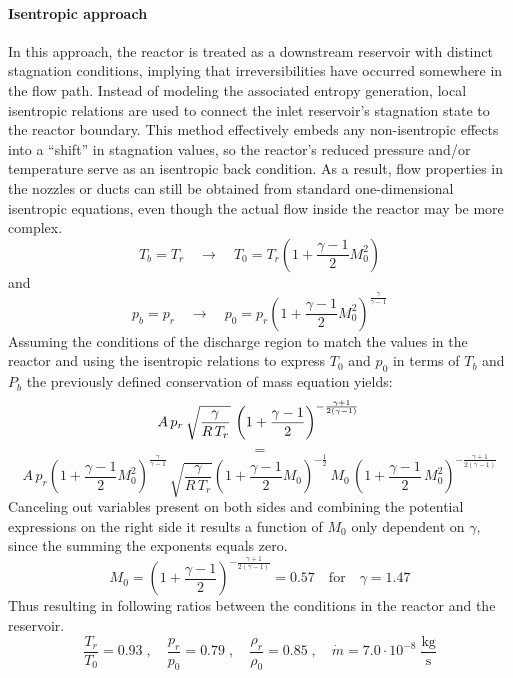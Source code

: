 \paragraph{Isentropic approach}
	In this approach, the reactor is treated as a downstream reservoir with distinct stagnation conditions, implying that irreversibilities have occurred somewhere in the flow path.
	Instead of modeling the associated entropy generation, local isentropic relations are used to connect the inlet reservoir’s stagnation state to the reactor boundary.
	This method effectively embeds any non-isentropic effects into a “shift” in stagnation values, so the reactor’s reduced pressure and/or temperature serve as an isentropic back condition.
	As a result, flow properties in the nozzles or ducts can still be obtained from standard one-dimensional isentropic equations, even though the actual flow inside the reactor may be more complex.
	$$
		T_b = T_r
		\quad \to \quad
		T_0 = T_r \left(1 + \frac{\gamma - 1}{2}M_0^2 \right)
	$$
	and
	$$
		p_b = p_r
		\quad \to \quad
		p_0 = p_r \left(1 + \frac{\gamma - 1}{2}M_0^2 \right)^{\frac{\gamma}{\gamma - 1}}
	$$
	Assuming the conditions of the discharge region to match the values in the reactor and using the isentropic relations to express $T_0$ and $p_0$ in terms of $T_b$ and $P_b$ the previously defined conservation of mass equation yields:
	$$
		A\, p_r\, \sqrt{\frac{\gamma}{R\,T_r}}\,\left(1+\frac{\gamma-1}{2}\right)^{-\frac{\gamma+1}{2(\gamma-1)}}\\
	$$
	$$
		=
	$$
	$$
		A\, p_r\left(1 + \frac{\gamma - 1}{2}M_0^2\right)^{\frac{\gamma}{\gamma-1}}\, \sqrt{\frac{\gamma}{R\,T_r}}\left(1 + \frac{\gamma - 1}{2}M_0\right)^{-\frac{1}{2}}\, M_0\,\left(1+\frac{\gamma-1}{2}\,M_0^2\right)^{-\frac{\gamma+1}{2(\gamma-1)}}
	$$
	Canceling out variables present on both sides and combining the potential expressions on the right side it results a function of $M_0$ only dependent on $\gamma$, since the summing the exponents equals zero.
	$$
		M_0 = (1 + \frac{\gamma - 1}{2})^{-\frac{\gamma + 1}{2(\gamma - 1)}}= 0.57
		\quad \text{for} \quad \gamma = 1.47
	$$
	Thus resulting in following ratios between the conditions in the reactor and the reservoir.
	$$
		\frac{T_r}{T_0} = 0.93\;,
			\quad
		\frac{p_r}{p_0} = 0.79\;,
			\quad
		\frac{\rho_r}{\rho_0} = 0.85\;,
			\quad
		\dot{m} = 7.0 \cdot 10^{-8}\; \frac{\text{kg}}{\text{s}}
	$$
	\newpage
